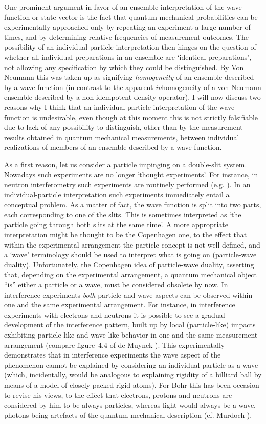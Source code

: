 \documentclass[12pt]{article}
\begin{document}
One prominent argument in favor of an ensemble interpretation of
the wave function or state vector is the fact that
quantum mechanical probabilities can be experimentally approached
only by repeating an experiment a large number of times, and by
determining relative frequencies of measurement outcomes. The
possibility of an individual-particle interpretation then hinges
on the question of whether all individual preparations in an
ensemble are `identical preparations', not allowing any
specification by which they could be distinguished. By Von Neumann
\cite{vN32} this was taken up as signifying {\em homogeneity} of
an ensemble described by a wave function (in contrast to the
apparent {\em in}homogeneity of a von Neumann ensemble described
by a non-idempotent density operator). I will now discuss two
reasons why I think that an individual-particle interpretation of
the wave function is undesirable, even though at this moment this is
not strictly falsifiable due to lack of any possibility to
distinguish, other than by the measurement results obtained in
quantum mechanical measurements, between individual realizations
of members of an ensemble described by a wave function.

As a first reason, let us consider a particle impinging on a
double-slit system. Nowadays such experiments are no longer
`thought experiments'. For instance, in neutron interferometry
such experiments are routinely performed (e.g.
\cite{WeKl,SuRaTu,Zeil86}). In an individual-particle
interpretation such experiments immediately entail a conceptual
problem. As a matter of fact, the wave function is split into two
parts, each corresponding to one of the slits. This is sometimes
interpreted as `the particle going through both slits at the same
time'. A more appropriate interpretation might be thought to be
the Copenhagen one, to the effect that within the experimental
arrangement the particle concept is not well-defined, and a `wave'
terminology should be used to interpret what is going on
(particle-wave duality). Unfortunately, the Copenhagen idea of
particle-wave duality, asserting that, depending on the
experimental arrangement, a quantum mechanical object ``is''
either a particle or a wave, must be considered obsolete by now.
In interference experiments {\em both} particle and wave aspects
can be observed within one and the same experimental arrangement.
For instance, in interference experiments with electrons and
neutrons it is possible to see a gradual development of the
interference pattern, built up by local (particle-like) impacts
exhibiting particle-like and wave-like behavior in one and the
same measurement arrangement (compare figure~4.4 of de Muynck
\cite{dM2002}). This experimentally demonstrates that in
interference experiments the wave aspect of the phenomenon cannot
be explained by considering an individual particle as a wave
(which, incidentally, would be analogous to explaining rigidity of
a billiard ball by means of a model of closely packed rigid
atoms). For Bohr this has been occasion to revise his views, to
the effect that electrons, protons and neutrons are considered by
him to be always particles, whereas light would always be a wave,
photons being artefacts of the quantum mechanical description (cf.
Murdoch \cite{Murd}).
\end{document}
